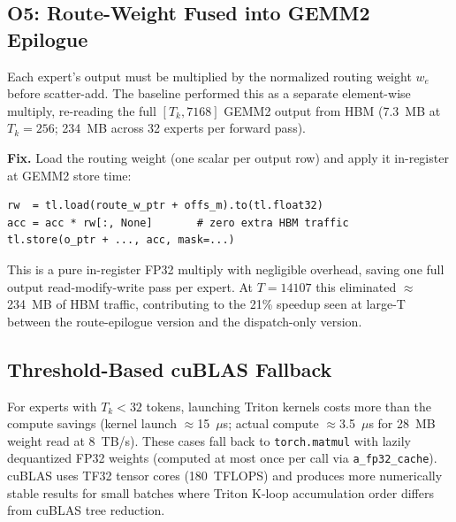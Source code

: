 \subsection{O5: Route-Weight Fused into GEMM2 Epilogue}

Each expert's output must be multiplied by the normalized routing weight $w_e$ before scatter-add.
The baseline performed this as a separate element-wise multiply, re-reading the full $[T_k, 7168]$ GEMM2 output from HBM (7.3~MB at $T_k{=}256$; 234~MB across 32 experts per forward pass).

\textbf{Fix.} Load the routing weight (one scalar per output row) and apply it in-register at GEMM2 store time:
\begin{lstlisting}
rw  = tl.load(route_w_ptr + offs_m).to(tl.float32)
acc = acc * rw[:, None]       # zero extra HBM traffic
tl.store(o_ptr + ..., acc, mask=...)
\end{lstlisting}
This is a pure in-register FP32 multiply with negligible overhead, saving one full output read-modify-write pass per expert.
At $T{=}14107$ this eliminated ${\approx}$234~MB of HBM traffic, contributing to the 21\% speedup seen at large-T between the route-epilogue version and the dispatch-only version.

\subsection{Threshold-Based cuBLAS Fallback}

For experts with $T_k{<}32$ tokens, launching Triton kernels costs more than the compute savings (kernel launch ${\approx}$15~$\mu$s; actual compute ${\approx}$3.5~$\mu$s for 28~MB weight read at 8~TB/s).
These cases fall back to \texttt{torch.matmul} with lazily dequantized FP32 weights (computed at most once per call via \texttt{a\_fp32\_cache}).
cuBLAS uses TF32 tensor cores (180~TFLOPS) and produces more numerically stable results for small batches where Triton K-loop accumulation order differs from cuBLAS tree reduction.
